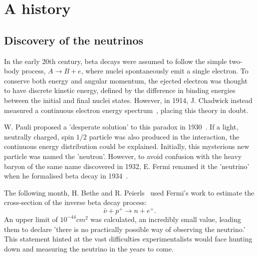 \section{A history}
\label{sec:theory_history}

\subsection{Discovery of the neutrinos} %
\label{sec:theory_history_neutrinos}

In the early 20th century, beta decays were assumed to follow the simple two-body process, $A
    \rightarrow B + e$, where nuclei spontaneously emit a single electron. To conserve both energy
and angular momentum, the ejected electron was thought to have discrete kinetic energy,
defined by the difference in binding energies between the initial and final nuclei states.
However, in 1914, J. Chadwick instead measured a continuous electron energy
spectrum~\cite{chadwick1914}, placing this theory in doubt.

W. Pauli proposed a 'desperate solution' to this paradox in 1930~\cite{pauli1930}. If a light,
neutrally charged, spin $1/2$ particle was also produced in the interaction, the continuous energy
distribution could be explained. Initially, this mysterious new particle was named the 'neutron'.
However, to avoid confusion with the heavy baryon of the same name discovered in 1932, E. Fermi
renamed it the 'neutrino' when he formalised beta decay in 1934~\cite{fermi1934}.

The following month, H. Bethe and R. Peierls~\cite{bethe1934} used Fermi's work to estimate the
cross-section of the inverse beta decay process:
\begin{equation} %
    \bar{\nu} + p^{+} \rightarrow n + e^{+}.
    \label{eq:inverse_beta_decay}
\end{equation} %
An upper limit of $10^{-44} cm^2$ was calculated, an incredibly small value, leading them to
declare 'there is no practically possible way of observing the neutrino.' This statement hinted at
the vast difficulties experimentalists would face hunting down and measuring the neutrino in the
years to come.

